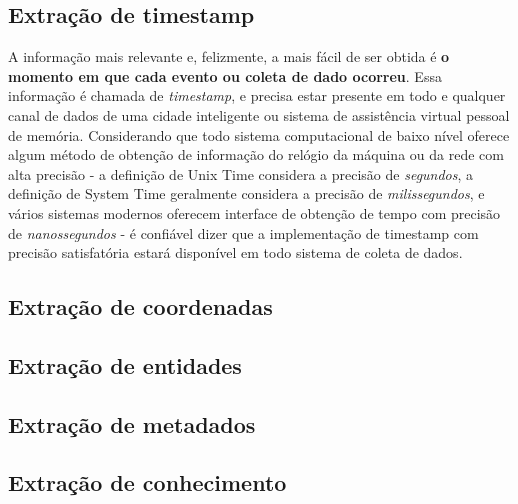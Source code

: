 \subsection{Extração de timestamp}

A informação mais relevante e, felizmente, a mais fácil de ser obtida é \textbf{o momento em que cada evento ou coleta de dado ocorreu}. Essa informação é chamada de \textit{timestamp}, e precisa estar presente em todo e qualquer canal de dados de uma cidade inteligente ou sistema de assistência virtual pessoal de memória. Considerando que todo sistema computacional de baixo nível oferece algum método de obtenção de informação do relógio da máquina ou da rede com alta precisão - a definição de Unix Time considera a precisão de \textit{segundos}, a definição de System Time geralmente considera a precisão de \textit{milissegundos}, e vários sistemas modernos oferecem interface de obtenção de tempo com precisão de \textit{nanossegundos} - é confiável dizer que a implementação de timestamp com precisão satisfatória estará disponível em todo sistema de coleta de dados.

\subsection{Extração de coordenadas}
\subsection{Extração de entidades}
\subsection{Extração de metadados}
\subsection{Extração de conhecimento}
